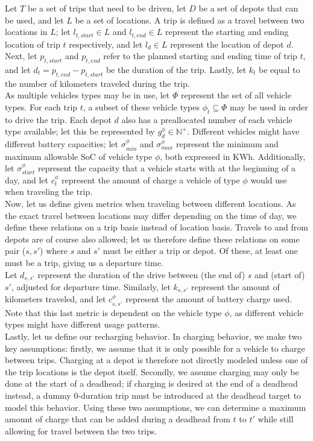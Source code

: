 \documentclass[]{article}
\begin{document}
Let $T$ be a set of trips that need to be driven, let $D$ be a set of depots that can be used, and let $L$ be a set of locations. A trip is defined as a travel between two locations in $L$; let $l_{t,start} \in L$ and $l_{t,end} \in L$ represent the starting and ending location of trip $t$ respectively, and let $l_d \in L$ represent the location of depot $d$. Next, let $p_{t,start}$ and $p_{t,end}$ refer to the planned starting and ending time of trip $t$, and let $d_t = p_{t,end} - p_{t,start}$ be the duration of the trip. Lastly, let $k_t$ be equal to the number of kilometers traveled during the trip. \\
As multiple vehicles types may be in use, let $\Phi$ represent the set of all vehicle types. For each trip $t$, a subset of these vehicle types $\phi_t \subseteq \Phi$ may be used in order to drive the trip. Each depot $d$ also has a preallocated number of each vehicle type available; let this be represented by $g^\phi_{d} \in \mathbb{N}^+$. Different vehicles might have different battery capacities; let $\sigma^\phi_{min}$ and $\sigma^\phi_{max}$ represent the minimum and maximum allowable SoC of vehicle type $\phi$, both expressed in KWh. Additionally, let $\sigma^\phi_{start}$ represent the capacity that a vehicle starts with at the beginning of a day, and let $c^\phi_t$ represent the amount of charge a vehicle of type $\phi$ would use when traveling the trip. \\
Now, let us define given metrics when traveling between different locations. As the exact travel between locations may differ depending on the time of day, we define these relations on a trip basis instead of location basis. Travels to and from depots are of course also allowed; let us therefore define these relations on some pair ($s,s'$) where $s$ and $s'$ must be either a trip or depot. Of these, at least one must be a trip, giving us a departure time. \\
Let $d_{s,s'}$ represent the duration of the drive between (the end of) $s$ and (start of) $s'$, adjusted for departure time. Similarly, let $k_{s, s'}$ represent the amount of kilometers traveled, and let $c^\phi_{s, s'}$ represent the amount of battery charge used. Note that this last metric is dependent on the vehicle type $\phi$, as different vehicle types might have different usage patterns. \\
Lastly, let us define our recharging behavior. In charging behavior, we make two key assumptions: firstly, we assume that it is only possible for a vehicle to charge between trips. Charging at a depot is therefore not directly modeled unless one of the trip locations is the depot itself. Secondly, we assume charging may only be done at the start of a deadhead; if charging is desired at the end of a deadhead instead, a dummy 0-duration trip must be introduced at the deadhead target to model this behavior. Using these two assumptions, we can determine a maximum amount of charge that can be added during a deadhead from $t$ to $t'$ while still allowing for travel between the two trips. \\
\end{document}
